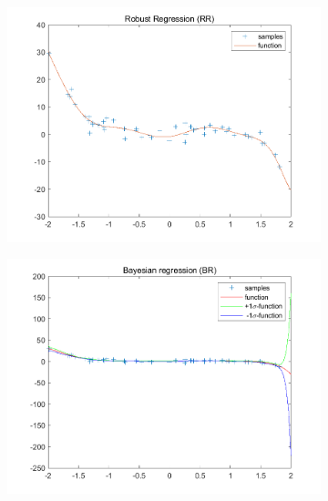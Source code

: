 \documentclass{article}
\begin{document}
\begin{figure}[H]
\begin{subfigure}[b]{0.475\textwidth}
        \includegraphics[width=\textwidth]{fig/1e-rr.png} 
    \end{subfigure}
    \quad
    \begin{subfigure}[b]{0.475\textwidth}   
        \centering 
        \includegraphics[width=\textwidth]{fig/1e-br.png} 
    \end{subfigure}
\end{figure}
\end{document}
